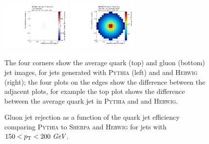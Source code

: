 \begin{figure}[htpb]
\begin{center}
  \includegraphics[width=0.31\textwidth]{figures/CNN/diff_truthg_pythiaherwig.pdf}
  \includegraphics[width=0.31\textwidth]{figures/CNN/gluon_truth_herwig.pdf}
\caption{
The four corners show the average quark (top) and gluon (bottom) jet images, for jets generated with \textsc{Pythia} (left) and
and \textsc{Herwig} (right); the four plots on the edges show the difference between the adjacent plots,
for example the top plot shows the difference between the average quark jet in \textsc{Pythia} and
and \textsc{Herwig}.}
\label{fig:cnn-avg:CNN}
\end{center}
\end{figure}


\begin{figure}[htpb]
\begin{center}
\caption{Gluon jet rejection as a function of the quark jet efficiency comparing \textsc{Pythia} to \protect{} \textsc{Sherpa}
and \protect{} \textsc{Herwig} for jets with $150<p_{{\rm T}}<200~\textit{GeV}$.}
\label{fig:cnn-pythiasherpa}
\end{center}
\end{figure}
